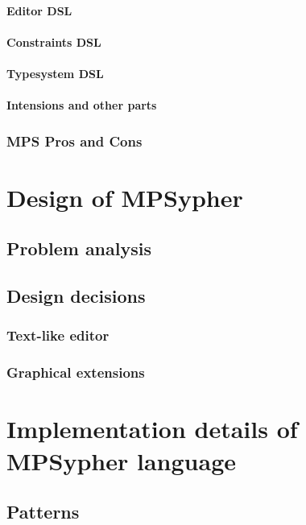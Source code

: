 		\subsubsection{Editor DSL}
		\subsubsection{Constraints DSL}
		\subsubsection{Typesystem DSL}
		\subsubsection{Intensions and other parts}

	\subsection{MPS Pros and Cons}


\chapter{Design of MPSypher}

\section{Problem analysis}

\section{Design decisions}

\subsection{Text-like editor}

\subsection{Graphical extensions}


\chapter{Implementation details of MPSypher language}

\section{Patterns}


